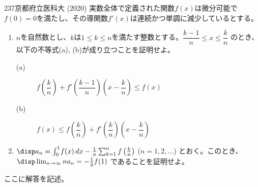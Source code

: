 \begin{thm}{237}{}{京都府立医科大 (2020)}
 実数全体で定義された関数$f(x)$は微分可能で $f(0)=0$を満たし、その導関数$f'(x)$は連続かつ単調に減少しているとする。
 \begin{enumerate}
  \item $n$を自然数とし、$k$は$1\le k\le n$を満たす整数とする。$\dfrac{k-1}{n}\le x\le\dfrac{k}{n}$ のとき、以下の不等式(a), (b)が成り立つことを証明せよ。
  \begin{description}
   \item[(a)] $f\left(\dfrac{k}{n}\right)+f'\left(\dfrac{k-1}{n}\right)\left(x-\dfrac{k}{n}\right)\le f(x)$
   \item[(b)] $f(x)\le f\left(\dfrac{k}{n}\right)+f'\left(\dfrac{k}{n}\right)\left(x-\dfrac{k}{n}\right)$
  \end{description}
  \item $\disp a_n=\int_0^1\!f(x) \,dx-\frac{1}{n}\sum_{k=1}^nf\left(\frac{k}{n}\right)$ ($n=1,2,\dots$) とおく。このとき、$\disp \lim_{n\to\infty} na_n=-\frac{1}{2}f(1)$ であることを証明せよ。
 \end{enumerate}
\end{thm}

ここに解答を記述。